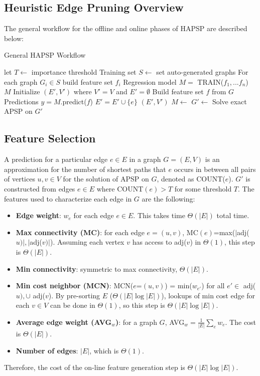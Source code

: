 \documentclass[10.5pt,journal]{IEEEtran}
\begin{document}
\subsection{Heuristic Edge Pruning Overview}
	The general workflow for the offline and online phases of HAPSP are described below:
	\begin{algorithm}
	\caption{General HAPSP Workflow}
	\begin{algorithmic}[1]
	\State let $T\leftarrow$ importance threshold
		\State Training set $S\leftarrow$ set auto-generated graphs
		\State For each graph $G_i\in S$ build feature set $f_i$
		\State Regression model $M = $ TRAIN($f_1,...f_n$)
		\State\Return $M$
	\EndProcedure
		\State Initialize $(E',V')$ where $V'=V$ and $E' = \emptyset$
		\State Build feature set $f$ from $G$
		\State Predictions $y = M$.predict($f$)
				\State $E'=E'\cup \{e\}$
			\EndIf
		\EndFor
		\State\Return $(E',V')$
	\EndProcedure
		\State $M\leftarrow$
		\State $G'\leftarrow$
		\State Solve exact APSP on $G'$
	\EndProcedure
	\end{algorithmic}
	\label{fig:alg}
	\end{algorithm}

\subsection{Feature Selection}
	A prediction for a particular edge $e\in E$ in a graph $G=(E,V)$ 
	is an approximation for the number of shortest paths 
	that $e$ occurs in between all pairs of vertices $u,v\in V$ for the solution of APSP on $G$, denoted as 
	COUNT($e$). $G'$ is constructed from edges $e\in E$ where COUNT$(e)>T$ for some threshold $T$. 
	The features used to characterize each edge in $G$ are the following:
	\begin{itemize}
		\item {\bf{Edge weight}}: $w_e$ for each edge $e\in E$. This takes time $\Theta(|E|)$ total time.
		\item{\bf{Max connectivity (MC)}}: for each edge $e=(u,v)$, MC$(e)$=max($|$adj($u)|,|$adj($v)|$).
			Assuming each vertex $v$ has access to adj($v$) in $\Theta(1)$, this step is $\Theta(|E|)$.
		\item{\bf{Min connectivity}}: symmetric to max connectivity, $\Theta(|E|)$. 
		\item{\bf{Min cost neighbor (MCN)}}: MCN($e$=$(u,v)$) = min($w_{e'}$) for all $e'\in$ adj($u),\cup$
			adj($v$). By pre-sorting $E$ ($\Theta(|E|\log|E|)$), lookups of min cost edge for each $v\in V$
			can be done in $\Theta(1)$, so this step is $\Theta(|E|\log|E|)$.
		\item{\bf{Average edge weight (AVG$_w$)}}: for a graph $G$, AVG$_w = \frac{1}{|E|}\sum_{e}w_e$.
			The cost is $\Theta(|E|)$.
		\item{\bf{Number of edges}}: $|E|$, which is $\Theta(1)$.
	\end{itemize}
	Therefore, the cost of the on-line feature generation step is $\Theta(|E|\log|E|)$.
	
\end{document}
